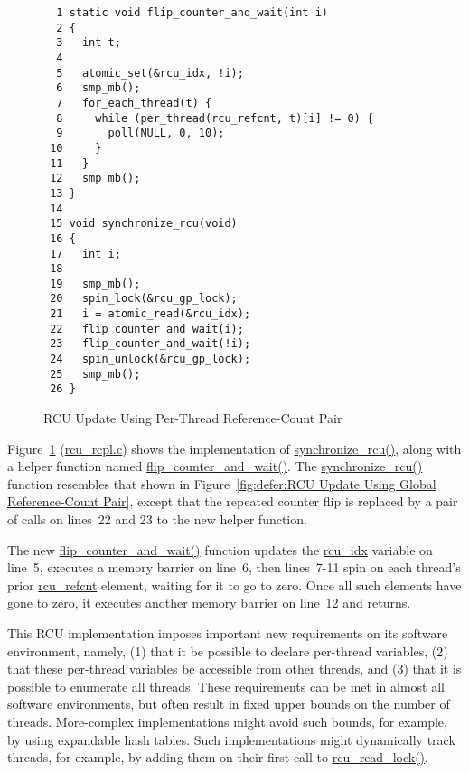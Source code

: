 \begin{figure}[tbp]
{ \scriptsize
\begin{verbatim}
  1 static void flip_counter_and_wait(int i)
  2 {
  3   int t;
  4
  5   atomic_set(&rcu_idx, !i);
  6   smp_mb();
  7   for_each_thread(t) {
  8     while (per_thread(rcu_refcnt, t)[i] != 0) {
  9       poll(NULL, 0, 10);
 10     }
 11   }
 12   smp_mb();
 13 }
 14
 15 void synchronize_rcu(void)
 16 {
 17   int i;
 18
 19   smp_mb();
 20   spin_lock(&rcu_gp_lock);
 21   i = atomic_read(&rcu_idx);
 22   flip_counter_and_wait(i);
 23   flip_counter_and_wait(!i);
 24   spin_unlock(&rcu_gp_lock);
 25   smp_mb();
 26 }
\end{verbatim}
}
\caption{RCU Update Using Per-Thread Reference-Count Pair}
\label{fig:defer:RCU Update Using Per-Thread Reference-Count Pair}
\end{figure}

Figure~\ref{fig:defer:RCU Update Using Per-Thread Reference-Count Pair}
(\url{rcu_rcpl.c})
shows the implementation of \url{synchronize_rcu()}, along with a helper
function named \url{flip_counter_and_wait()}.
The \url{synchronize_rcu()} function resembles that shown in
Figure~\ref{fig:defer:RCU Update Using Global Reference-Count Pair},
except that the repeated counter flip is replaced by a pair of calls
on lines~22 and 23 to the new helper function.

The new \url{flip_counter_and_wait()} function updates the
\url{rcu_idx} variable on line~5, executes a memory barrier on line~6,
then lines~7-11 spin on each thread's prior \url{rcu_refcnt} element,
waiting for it to go to zero.
Once all such elements have gone to zero,
it executes another memory barrier on line~12 and returns.

This RCU implementation imposes important new requirements on its
software environment, namely, (1) that it be possible to declare
per-thread variables, (2) that these per-thread variables be accessible
from other threads, and (3) that it is possible to enumerate all threads.
These requirements can be met in almost all software environments,
but often result in fixed upper bounds on the number of threads.
More-complex implementations might avoid such bounds, for example, by using
expandable hash tables.
Such implementations might dynamically track threads, for example, by
adding them on their first call to \url{rcu_read_lock()}.

